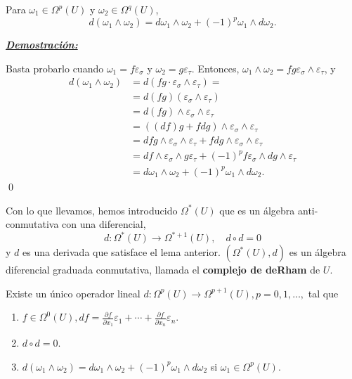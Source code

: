 \newpage

\begin{Lem}
Para $\omega_1\in \Omega^p(U)$ y $\omega_2\in \Omega^q(U)$,
$$d(\omega_1\wedge \omega_2)=d\omega_1\wedge \omega_2+(-1)^p \omega_1\wedge d\omega_2. $$
\end{Lem}

\underline{\textbf{\textit{Demostración:}}}

Basta probarlo cuando $\omega_1=f\varepsilon_\sigma $ y $\omega_2=g\varepsilon_{\tau} $. Entonces, $\omega_1\wedge \omega_2=fg\varepsilon_\sigma \wedge \varepsilon_\tau $, y
\begin{equation}
  \begin{split}
    d(\omega_1\wedge \omega_2)&= d(fg \cdot\varepsilon_\sigma \wedge \varepsilon_\tau)= \\
    &=d(fg)(\varepsilon_\sigma \wedge \varepsilon_\tau) \\
    &=d(fg)\wedge \varepsilon_\sigma \wedge \varepsilon_\tau \\
    &=((df)g+fdg)\wedge \varepsilon_\sigma \wedge \varepsilon_\tau \\
    &=dfg\wedge \varepsilon_\sigma \wedge \varepsilon_\tau + fdg\wedge \varepsilon_\sigma \wedge \varepsilon_\tau \\
    &=df\wedge \varepsilon_\sigma \wedge g\varepsilon_\tau +(-1)^p f \varepsilon_\sigma \wedge dg \wedge\varepsilon_\tau \\
    &= d\omega_1\wedge \omega_2+(-1)^p \omega_1\wedge d\omega_2.
  \end{split}
\end{equation}
\qed

Con lo que llevamos, hemos introducido $\Omega^*(U)$ que es un álgebra anti-conmutativa con una diferencial,
$$d:\Omega^*(U)\rightarrow \Omega^{*+1}(U),\quad d\circ d=0 $$
y $d$ es una derivada que satisface el lema anterior. $(\Omega^*(U),d)$ es un álgebra diferencial graduada conmutativa, llamada el \textbf{complejo de deRham} de $U$.

\begin{Teo}
Existe un único operador lineal $d:\Omega^p(U)\rightarrow \Omega^{p+1}(U),p=0,1,\dots,$ tal que
\begin{enumerate}
\item $f\in \Omega^0(U),df=\frac{\partial f}{\partial x_1}\varepsilon_1+\cdots + \frac{\partial f}{\partial x_n}\varepsilon_n$.
\item $d\circ d=0$.
\item $d(\omega_1\wedge \omega_2)=d\omega_1\wedge \omega_2+(-1)^p\omega_1\wedge d\omega_2$ si $\omega_1\in \Omega^p(U)$. 
\end{enumerate}
\end{Teo}

